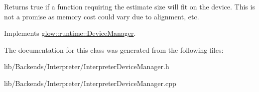 Returns true if a function requiring the {\ttfamily estimate} size will fit on the device. This is not a promise as memory cost could vary due to alignment, etc. 

Implements \hyperlink{classglow_1_1runtime_1_1_device_manager_ae9bba4abda9cb6aa1359a69e942feb22}{glow\+::runtime\+::\+Device\+Manager}.



The documentation for this class was generated from the following files\+:\begin{DoxyCompactItemize}
\item 
lib/\+Backends/\+Interpreter/Interpreter\+Device\+Manager.\+h\item 
lib/\+Backends/\+Interpreter/Interpreter\+Device\+Manager.\+cpp\end{DoxyCompactItemize}
